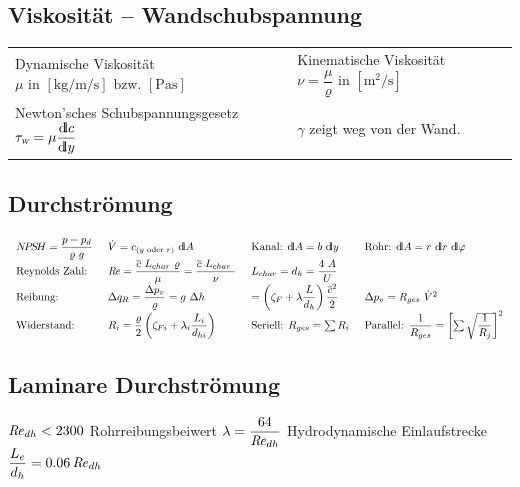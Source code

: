 \subsection{Viskosität -- Wandschubspannung}
	\begin{center}
		\setlength{\tabcolsep}{2em} %
		\begin{tabular}{ll}
		      Dynamische Viskosität $ \mu \text{ in } \left[\unit{\kg\per\m\per\s}\right] \text{ bzw. } \left[\unit{\Pa\s}\right] $
			& Kinematische Viskosität $ \nu = \dfrac{\mu}{\varrho} \text{ in } \left[\unit{\m\squared \per\s}\right] $
			\\
			  Newton'sches Schubspannungsgesetz $ \tau_{\textsl{w}} = \mu \dfrac{{\operatorname{d\!l}} c}{{\operatorname{d\!l}} y} $
			& $\gamma$ zeigt weg von der Wand.
		\end{tabular}
	\end{center}

\subsection{Durchströmung}
	\setlength{\abovedisplayskip}{-15pt}
	\[ \arraycolsep=0.7em
		\begin{array}{llll}
			N\!P\!S\!H = \dfrac{p - p_d}{\varrho\ g} & \dot{V} = c_{(y \text{ oder } r)} \ \dd A                                                    & \text{Kanal: } \dd A = b\ \dd y                                          & \text{Rohr: } \dd A = r\ \dd r\ \dd\varphi \\
			\text{Reynolds Zahl:}                    & \Reyn = \dfrac{\overline{c}\ L_{char}\ \varrho}{\mu} = \dfrac{\overline{c}\ L_{char}\ }{\nu} & L_{char} = d_h = \dfrac{4\ A}{U}                                         &                                             \\
			\text{Reibung:}                          & \Delta q_R = \dfrac{\Delta p_v}{\varrho} = g\ \Delta h                                       & = \left( \zeta_F + \lambda \dfrac{L}{d_h} \right) \dfrac{\overline{c}^2}{2} & \Delta p_v = R_{ges}\ \dot{V}^2             \\
			\text{Widerstand:}                       & R_i = \dfrac{\varrho}{2}  \left( \zeta_{Fi} + \lambda_i \dfrac{L_i}{d_{hi}}\right)              & \text{Seriell: } R_{ges} = \sum R_i  & \text{Parallel: } \dfrac{1}{R_{ges}} = \left[\sum\sqrt{\dfrac{1}{R_j}}\right]^2
		\end{array}
	\]
\subsection{Laminare Durchströmung}
	$ \operatorname{\mathit{R\kern-.10em e}}_{dh} < 2300 $ \quad	Rohrreibungsbeiwert $ \lambda = \dfrac{64}{\operatorname{\mathit{R\kern-.10em e}}_{dh}} $ \qquad	Hydrodynamische Einlaufstrecke $ \dfrac{L_e}{d_h} = \num{0,06} \operatorname{\mathit{R\kern-.10em e}}_{dh}  $

